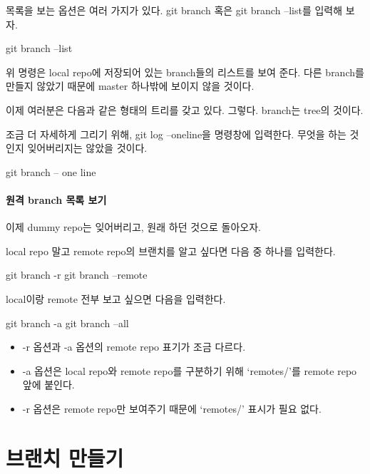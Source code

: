 \documentclass[12pt, a4paper, oneside]{book}
\let\stdsection\section
\renewcommand\section{\newpage\stdsection}
\begin{document}
목록을 보는 옵션은 여러 가지가 있다. git branch 혹은 git branch --list를 입력해 보자.

		\begin{tcolorbox}
 		git branch  --list
		\end{tcolorbox}

위 명령은 local repo에 저장되어 있는 branch들의 리스트를 보여 준다. 
다른 branch를 만들지 않았기 때문에 master 하나밖에 보이지 않을 것이다.

이제 여러분은 다음과 같은 형태의 트리를 갖고 있다.
그렇다. branch는 tree의 것이다.

조금 더 자세하게 그리기 위해, git log --oneline을 명령창에 입력한다. 
무엇을 하는 것인지 잊어버리지는 않았을 것이다.

		\begin{tcolorbox}
 		git branch  -- one line
		\end{tcolorbox}


\paragraph{원격 branch 목록 보기}
이제 dummy repo는 잊어버리고, 원래 하던 것으로 돌아오자.

local repo 말고 remote repo의 브랜치를 알고 싶다면 다음 중 하나를 입력한다.

		\begin{tcolorbox}
		git branch -r
		git branch –remote
		\end{tcolorbox}

local이랑 remote 전부 보고 싶으면 다음을 입력한다.

		\begin{tcolorbox}
		git branch -a
		git branch –all
		\end{tcolorbox}

		\begin{itemize}	[							leftmargin=6em]
		\item 	-r 옵션과 -a 옵션의 remote repo 표기가 조금 다르다.
		\item -a 옵션은 local repo와 remote repo를 구분하기 위해 ‘remotes/’를 remote repo 앞에 붙인다.
		\item -r 옵션은 remote repo만 보여주기 때문에 ‘remotes/’ 표시가 필요 없다.
		\end{itemize}

	\section{브랜치 만들기 }
\end{document}
